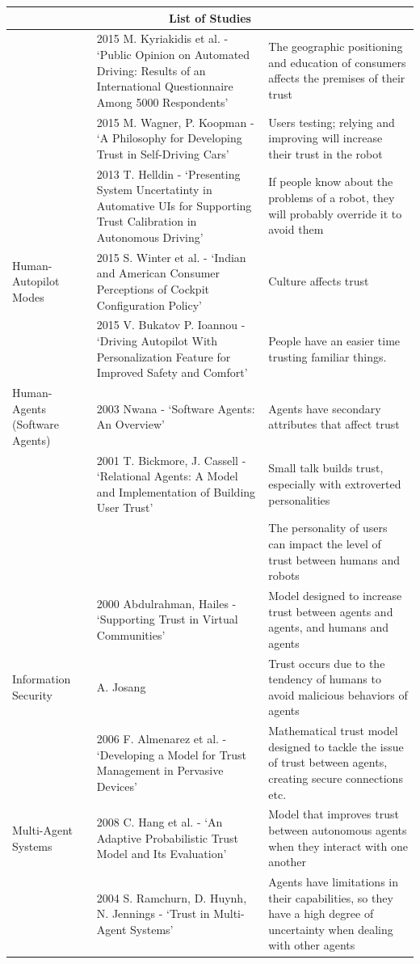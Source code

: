 \documentclass[runningheads,a4paper]{llncs}
\begin{document}
\begin{center}
\begin{tabular}{ |p{2cm}|p{4cm}|p{6cm}|  }
\hline
\multicolumn{3}{|c|}{List of Studies} \\
\hline
 & 2015 M. Kyriakidis et al. - `Public Opinion on Automated Driving: Results of an International Questionnaire Among 5000 Respondents' & The geographic positioning and education of consumers affects the premises of their trust\\
\hline
 & 2015 M. Wagner, P. Koopman - `A Philosophy for Developing Trust in Self-Driving Cars' & Users testing; relying and improving will increase their trust in the robot\\
\hline
 & 2013 T. Helldin - `Presenting System Uncertatinty in Automative UIs for Supporting Trust Calibration in Autonomous Driving' & If people know about the problems of a robot, they will probably override it to avoid them\\
\hline
Human-Autopilot Modes & 2015 S. Winter et al. - `Indian and American Consumer Perceptions of Cockpit Configuration Policy' & Culture affects trust\\
\hline
 & 2015 V. Bukatov P. Ioannou - `Driving Autopilot With Personalization Feature for Improved Safety and Comfort' & People have an easier time trusting familiar things.\\
\hline
Human-Agents (Software Agents) & 2003 Nwana - `Software Agents: An Overview' & Agents have secondary attributes that affect trust\\
\hline
 & 2001 T. Bickmore, J. Cassell - `Relational Agents: A Model and Implementation of Building User Trust' & Small talk builds trust, especially with extroverted personalities\\
 & & The personality of users can impact the level of trust between humans and robots\\
\hline
 & 2000 Abdulrahman, Hailes - `Supporting Trust in Virtual Communities' & Model designed to increase trust between agents and agents, and humans and agents\\
\hline
Information Security & A. Josang & Trust occurs due to the tendency of humans to avoid malicious behaviors of agents\\
\hline
 & 2006 F. Almenarez et al. - `Developing a Model for Trust Management in Pervasive Devices' & Mathematical trust model designed to tackle the issue of trust between agents, creating secure connections etc.\\
\hline
Multi-Agent Systems & 2008 C. Hang et al. - `An Adaptive Probabilistic Trust Model and Its Evaluation' & Model that improves trust between autonomous agents when they interact with one another\\
\hline
 & 2004 S. Ramchurn, D. Huynh, N. Jennings - `Trust in Multi-Agent Systems' & Agents have limitations in their capabilities, so they have a high degree of uncertainty when dealing with other agents\\
\hline
\end{tabular}


\end{center}
\end{document}
